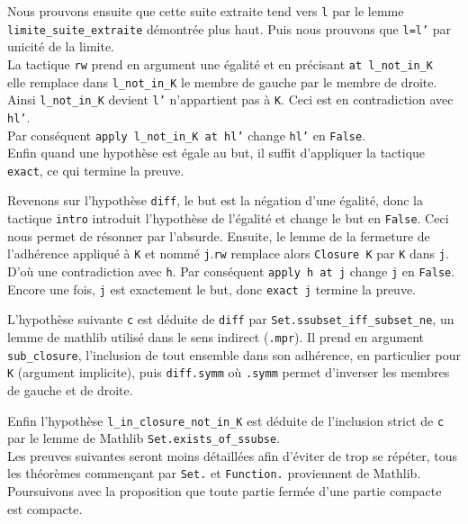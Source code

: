 \documentclass[a4paper, 12pt]{article}
\newcommand{\lean}[1]{\texttt{#1}}
\begin{document}
\begin{itemize}[itemsep=30pt]
        Nous prouvons ensuite que cette suite extraite tend vers \lean{l} par le lemme \lean{limite_suite_extraite} démontrée plus haut. Puis nous prouvons que \lean{l=l'} par unicité de la limite.\\
        La tactique \lean{rw} prend en argument une égalité et en précisant \lean{at l_not_in_K } elle remplace dans \lean{l_not_in_K} le membre de gauche par le membre de droite. Ainsi \lean{l_not_in_K} devient \lean{l'} n'appartient pas à \lean{K}. Ceci est en contradiction avec \lean{hl'}.\\
        Par conséquent \lean{apply l_not_in_K at hl'} change \lean{hl'} en \lean{False}.\\
        Enfin quand une hypothèse est égale au but, il suffit d'appliquer la tactique \lean{exact}, ce qui termine la preuve.
\end{itemize}

\vspace{\baselineskip}
Revenons sur l'hypothèse \lean{diff}, le but est la négation d'une égalité, donc la tactique \lean{intro} introduit l'hypothèse de l'égalité et change le but en \lean{False}. Ceci nous permet de résonner par l'absurde. Ensuite, le lemme de la fermeture de l'adhérence appliqué à \lean{K} et nommé \lean{j}.\lean{rw} remplace alors \lean{Closure K} par \lean{K} dans \lean{j}. D'où une contradiction avec \lean{h}. Par conséquent \lean{apply h at j} change \lean{j} en \lean{False}. Encore une fois, \lean{j} est exactement le but, donc \lean{exact j} termine la preuve.

L'hypothèse suivante \lean{c} est déduite de \lean{diff} par \lean{Set.ssubset_iff_subset_ne}, un lemme de mathlib utilisé dans le sens indirect (\lean{.mpr}). Il prend en argument \lean{sub_closure}, l'inclusion de tout ensemble dans son adhérence, en particulier pour \lean{K} (argument implicite), puis \lean{diff.symm} où \lean{.symm} permet d'inverser les membres de gauche et de droite.

Enfin l'hypothèse \lean{l_in_closure_not_in_K} est déduite de l'inclusion strict de \lean{c} par le lemme de Mathlib \lean{Set.exists_of_ssubse}.\\

Les preuves suivantes seront moins détaillées afin d'éviter de trop se répéter, tous les théorèmes commençant par \lean{Set.} et \lean{Function.} proviennent de Mathlib. Poursuivons avec la proposition que toute partie fermée d'une partie compacte est compacte.\\
\end{document}
